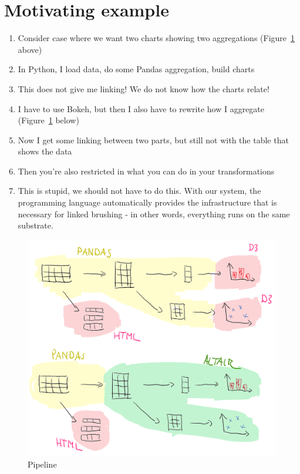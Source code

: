 \section{Motivating example}
\label{sec:motivation}

\begin{enumerate}
\item Consider case where we want two charts showing two aggregations (Figure~\ref{fig:pipeline} above)
\item In Python, I load data, do some Pandas aggregation, build charts
\item This does not give me linking! We do not know how the charts relate!
\item I have to use Bokeh, but then I also have to rewrite how I aggregate (Figure~\ref{fig:pipeline} below)
\item Now I get some linking between two parts, but still not with the table that shows the data
\item Then you're also restricted in what you can do in your transformations
\item This is stupid, we should not have to do this. With our system, the programming language
  automatically provides the infrastructure that is necessary for linked brushing - in other words,
  everything runs on the same substrate.
\end{enumerate}

\begin{figure}
\includegraphics[scale=0.35]{image/pipeline}
\caption{Pipeline}
\label{fig:pipeline}
\end{figure}
